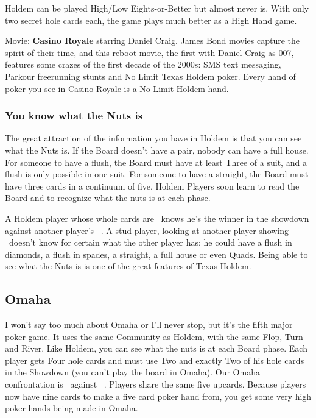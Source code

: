 Holdem can be played High/Low Eights-or-Better but almost never
is. With only two secret hole cards each, the game plays much better
as a High Hand game.

Movie: \textbf{Casino Royale} starring Daniel Craig. James Bond movies
capture the spirit of their time, and this reboot movie, the first
with Daniel Craig as 007, features some crazes of the first decade of
the 2000s: SMS text messaging, Parkour freerunning stunts and No Limit
Texas Holdem poker. Every hand of poker you see in Casino Royale is a
No Limit Holdem hand.

\subsubsection{You know what the Nuts is}

The great attraction of the information you have in Holdem is that you
can see what the Nuts is. If the Board doesn't have a pair, nobody can
have a full house. For someone to have a flush, the Board must have at
least Three of a suit, and a flush is only possible in one suit. For
someone to have a straight, the Board must have three cards in a
continuum of five. Holdem Players soon learn to read the Board and to
recognize what the nuts is at each phase.

A Holdem player whose whole cards are \Ad\tred\ knows he's the winner
in the showdown against another player's
\back\back\nines\Qd\Jd\tres\fourd\ . A stud player, looking at another
player showing \back\back\nines\Qd\Jd\tres\back\ doesn't know for
certain what the other player has; he could have a flush in diamonds,
a flush in spades, a straight, a full house or even Quads. Being able
to see what the Nuts is is one of the great features of Texas Holdem.

\subsection{Omaha}

I won't say too much about Omaha or I'll never stop, but it's the
fifth major poker game. It uses the same Community as
Holdem, with the same Flop, Turn and River. Like Holdem, you can see
what the nuts is at each Board phase. Each player gets Four hole
cards and must use Two and exactly Two of his hole cards in the
Showdown (you can't play the board in Omaha). Our Omaha confrontation
is 
\back\back\back\back\nines\Qd\Jd\tres\fourd\ against
\back\back\back\back\nines\Qd\Jd\tres\fourd\ . Players share the same five
upcards. Because players now have nine cards to make a five card poker
hand from, you get some very high poker hands being made in Omaha.

